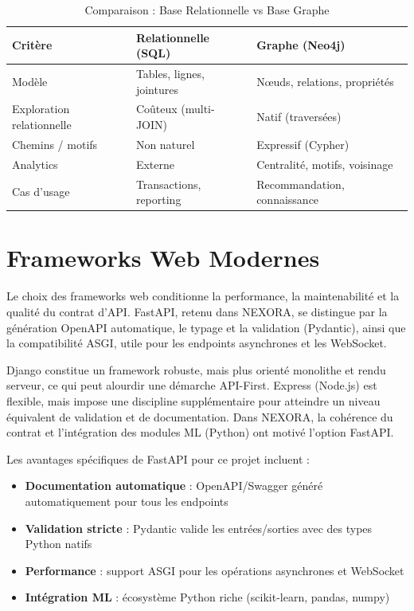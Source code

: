 \documentclass[12pt,a4paper]{report}
\begin{document}
\begin{table}[H]
\centering
\caption{Comparaison : Base Relationnelle vs Base Graphe}
\label{tab:rel_vs_graph}
\begin{tabular}{p{5cm} p{5cm} p{5cm}}
\toprule
\textbf{Critère} & \textbf{Relationnelle (SQL)} & \textbf{Graphe (Neo4j)} \\
\midrule
Modèle & Tables, lignes, jointures & Nœuds, relations, propriétés \\
Exploration relationnelle & Coûteux (multi-JOIN) & Natif (traversées) \\
Chemins / motifs & Non naturel & Expressif (Cypher) \\
Analytics & Externe & Centralité, motifs, voisinage \\
Cas d'usage & Transactions, reporting & Recommandation, connaissance \\
\bottomrule
\end{tabular}
\end{table}

\section{Frameworks Web Modernes}
Le choix des frameworks web conditionne la performance, la maintenabilité et la qualité du contrat d'API. FastAPI, retenu dans NEXORA, se distingue par la génération OpenAPI automatique, le typage et la validation (Pydantic), ainsi que la compatibilité ASGI, utile pour les endpoints asynchrones et les WebSocket.

Django constitue un framework robuste, mais plus orienté monolithe et rendu serveur, ce qui peut alourdir une démarche API-First. Express (Node.js) est flexible, mais impose une discipline supplémentaire pour atteindre un niveau équivalent de validation et de documentation. Dans NEXORA, la cohérence du contrat et l'intégration des modules ML (Python) ont motivé l'option FastAPI.

Les avantages spécifiques de FastAPI pour ce projet incluent :
\begin{itemize}
  \item \textbf{Documentation automatique} : OpenAPI/Swagger généré automatiquement pour tous les endpoints
  \item \textbf{Validation stricte} : Pydantic valide les entrées/sorties avec des types Python natifs
  \item \textbf{Performance} : support ASGI pour les opérations asynchrones et WebSocket
  \item \textbf{Intégration ML} : écosystème Python riche (scikit-learn, pandas, numpy)
\end{itemize}
\end{document}
